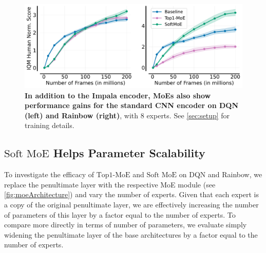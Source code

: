 \documentclass{article}
\theoremstyle{plain}
\theoremstyle{definition}
\theoremstyle{remark}
\newcommand{\moe}{$\textrm{Top1-MoE}$}
\newcommand{\softmoe}{$\textrm{Soft MoE}$}
\begin{document}
\begin{figure}[!t]
    \centering
    \includegraphics[width=\linewidth]{figures/combinedCNN.pdf}
    \vspace{-0.4cm}
    \caption{{\bf In addition to the Impala encoder, MoEs also show performance gains for the standard CNN encoder on DQN (left) and Rainbow (right)}, with $8$ experts. See \cref{sec:setup} for training details.}
    \label{fig:CNNEval}%
    \vspace{-0.3cm}
\end{figure}

\subsection{\softmoe{} Helps Parameter Scalability}
To investigate the efficacy of \moe{} and \softmoe{} on DQN and Rainbow, we replace the penultimate layer with the respective MoE module (see \cref{fig:moeArchitecture}) and vary the number of experts. Given that each expert is a copy of the original penultimate layer, we are effectively increasing the number of parameters of this layer by a factor equal to the number of experts. To compare more directly in terms of number of parameters, we evaluate simply widening the penultimate layer of the base architectures by a factor equal to the number of experts.
\end{document}

